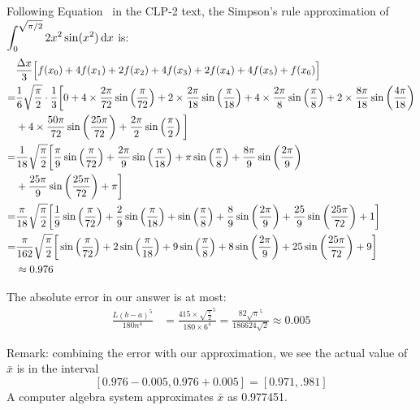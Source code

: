 \begin{solution}
\begin{center}
\end{center}

Following Equation~ in the CLP-2 text, the Simpson's rule approximation of $\displaystyle\int_0^{\sqrt{\pi/2}}2x^2\sin(x^2)\,\mathrm{d}x$ is:
\begin{align*}
&\frac{\Delta x}{3}\Big[f(x_0)+4f(x_1)+2f(x_2)+4f(x_3)+2f(x_4)+4f(x_5)+f(x_6)\Big]\\
=&\frac{1}{6}\sqrt{\frac{\pi}{2}}\cdot\frac{1}{3}\bigg[
0+4\times \frac{2\pi}{72}\sin\left(\frac{\pi}{72}\right)+2\times\frac{2\pi}{18}\sin\left(\frac{\pi}{18}\right)+4\times\frac{2\pi}{8}\sin\left(\frac{\pi}{8}\right)+
2\times \frac{8\pi}{18}\sin\left(\frac{4\pi}{18}\right)\\
&+4\times \frac{50\pi}{72}\sin\left(\frac{25\pi}{72}\right)
+\frac{2\pi}{2}\sin\left(\frac{\pi}{2}\right)
\bigg]\\=&\frac{1}{18}\sqrt{\frac{\pi}{2}}\bigg[
\frac{\pi}{9}\sin\left(\frac{\pi}{72}\right)+\frac{2\pi}{9}\sin\left(\frac{\pi}{18}\right)+\pi\sin\left(\frac{\pi}{8}\right)+
\frac{8\pi}{9}\sin\left(\frac{2\pi}{9}\right)\\
&+\frac{25\pi}{9}\sin\left(\frac{25\pi}{72}\right)
+\pi\bigg]\\=&\frac{\pi}{18}\sqrt{\frac{\pi}{2}}\bigg[
\frac{1}{9}\sin\left(\frac{\pi}{72}\right)+\frac{2}{9}\sin\left(\frac{\pi}{18}\right)+\sin\left(\frac{\pi}{8}\right)+
\frac{8}{9}\sin\left(\frac{2\pi}{9}\right)+\frac{25}{9}\sin\left(\frac{25\pi}{72}\right)
+1\bigg]\\=&\frac{\pi}{162}\sqrt{\frac{\pi}{2}}\bigg[
\sin\left(\frac{\pi}{72}\right)+2\sin\left(\frac{\pi}{18}\right)+9\sin\left(\frac{\pi}{8}\right)+
8\sin\left(\frac{2\pi}{9}\right)+25\sin\left(\frac{25\pi}{72}\right)
+9\bigg]\\
&\approx 0.976
\end{align*}

The absolute error in our answer is at most:
\begin{align*}
\frac{L(b-a)^5}{180n^4}&=\frac{415\times\sqrt{\frac{\pi}{2}}^5}{180\times 6^4} = \frac{82\sqrt{\pi}^5}{186624\sqrt{2}}\approx 0.005
\end{align*}


Remark: combining the error with our approximation, we see the actual value of $\bar x$ is in the interval
\[\left[0.976-0.005,0.976+0.005\right] = \left[0.971,.981\right]\]
A computer algebra system approximates $\bar x$ as 0.977451.
\end{solution}
